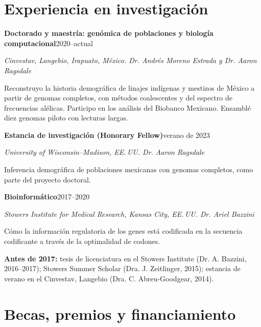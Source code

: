 \documentclass[11pt,letterpaper]{article}
\newcommand{\entrada}[3]{\textbf{#1}\hfill{\small #3}\par{\itshape #2}\par}
\newcommand{\fila}[2]{\item #1\unskip\nobreak\hfill\penalty50\hskip1em\null\nobreak\hfill{\small #2}}
\begin{document}
\section*{Experiencia en investigación}
\entrada{Doctorado y maestría: genómica de poblaciones y biología computacional}{Cinvestav, Langebio, Irapuato, México. Dr. Andrés Moreno Estrada y Dr. Aaron Ragsdale}{2020--actual}
{\small Reconstruyo la historia demográfica de linajes indígenas y mestizos de México a partir de genomas completos, con métodos coalescentes y del espectro de frecuencias alélicas. Participo en los análisis del Biobanco Mexicano. Ensamblé diez genomas piloto con lecturas largas.}\par\smallskip
\entrada{Estancia de investigación (Honorary Fellow)}{University of Wisconsin--Madison, EE.\,UU. Dr. Aaron Ragsdale}{verano de 2023}
{\small Inferencia demográfica de poblaciones mexicanas con genomas completos, como parte del proyecto doctoral.}\par\smallskip
\entrada{Bioinformático}{Stowers Institute for Medical Research, Kansas City, EE.\,UU. Dr. Ariel Bazzini}{2017--2020}
{\small Cómo la información regulatoria de los genes está codificada en la secuencia codificante a través de la optimalidad de codones.}\par\smallskip
\textbf{Antes de 2017:} tesis de licenciatura en el Stowers Institute (Dr. A. Bazzini, 2016--2017); Stowers Summer Scholar (Dra. J. Zeitlinger, 2015); estancia de verano en el Cinvestav, Langebio (Dra. C. Abreu-Goodgear, 2014).

\section*{Becas, premios y financiamiento}
\end{document}
